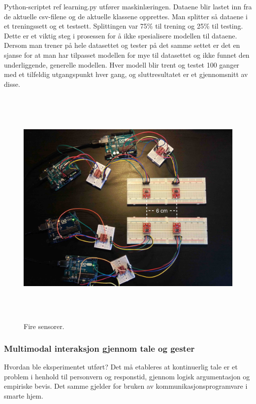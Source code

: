Python-scriptet {\color{red} ref learning.py} utfører maskinlæringen. Dataene blir lastet inn fra de aktuelle csv-filene og de aktuelle klassene opprettes. Man splitter så dataene i et treningssett og et testsett. Splittingen var 75\% til trening og 25\% til testing. Dette er et viktig steg i prosessen for å ikke spesialisere modellen til dataene. Dersom man trener på hele datasettet og tester på det samme settet er det en sjanse for at man har tilpasset modellen for mye til datasettet og ikke funnet den underliggende, generelle modellen. Hver modell blir trent og testet 100 ganger med et tilfeldig utgangspunkt hver gang, og sluttresultatet er et gjennomsnitt av disse.

\begin{figure}[h]
\centering
\includegraphics[width=15cm, height=12cm]{fig/foursensors}
\caption{Fire sensorer.}
\label{fig:four-sensors}
\end{figure}



\subsubsection{Multimodal interaksjon gjennom tale og gester}
{\color{red}Hvordan ble eksperimentet utført?}
Det må etableres at kontinuerlig tale er et problem i henhold til personvern og responstid, gjennom logisk argumentasjon og empiriske bevis. Det samme gjelder for bruken av kommunikasjonsprogramvare i smarte hjem.

